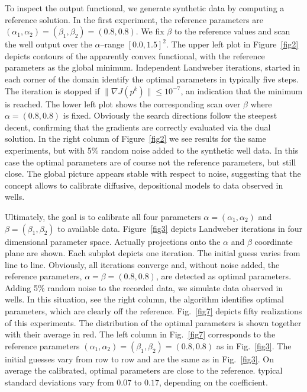 To inspect the output functional,
we generate synthetic data by computing a reference solution.
In the first experiment, the reference parameters are
$(\alpha_1, \alpha_2)=(\beta_1, \beta_2)=(0.8,0.8)$.
We fix $\beta$ to the reference values and scan the well output over the $\alpha$--range $[0.0, 1.5]^2$.
The upper left plot in Figure~\ref{fig2} depicts contours of the apparently convex functional,
with the reference parameters as the global minimum.
Independent Landweber iterations, started in each corner of the domain
identify the optimal parameters in typically five steps.
The iteration is stopped if $\| \nabla J(p^k) \| \le 10^{-7}$, an indication that the minimum is reached.
The lower left plot shows the corresponding scan over $\beta$ where $\alpha=(0.8,0.8)$ is fixed.
Obviously the search directions follow the steepest decent,
confirming that the gradients are correctly evaluated via the dual solution.
In the right column of Figure~\ref{fig2} we see results for the same experiments,
but with 5\% random noise added to the synthetic well data.
In this case the optimal parameters are of course not the reference parameters, but still close.
The global picture appears stable with respect to noise,
suggesting that the concept allows to calibrate diffusive, depositional models to data observed in wells.

Ultimately, the goal is to calibrate all four parameters
$\alpha = (\alpha_1, \alpha_2)$ and $\beta = (\beta_1, \beta_2)$
to available data.
Figure~\ref{fig3} depicts Landweber iterations in four dimensional parameter space.
Actually projections onto the $\alpha$ and $\beta$ coordinate plane are shown.
Each subplot depicts one iteration.
The initial guess varies from line to line.
Obviously, all iterations converge and, without noise added,
the reference parameters, $\alpha = \beta = (0.8, 0.8)$, are detected as optimal parameters.
Adding 5\% random noise to the recorded data, we simulate data observed in wells.
In this situation, see the right column,
the algorithm identifies optimal parameters, which are clearly off the reference.
Fig.~\ref{fig7} depicts fifty realizations of this experiments.
The distribution of the optimal parameters is shown together with their average in red.
The left column in Fig.~\ref{fig7} corresponds to the reference parameters
$(\alpha_1, \alpha_2)=(\beta_1, \beta_2)=(0.8,0.8)$ as in Fig.~\ref{fig3}.
The initial guesses vary from row to row and are the same as in Fig.~\ref{fig3}.
On average the calibrated, optimal parameters are close to the reference.
typical standard deviations vary from $0.07$ to $0.17$, depending on the coefficient.

